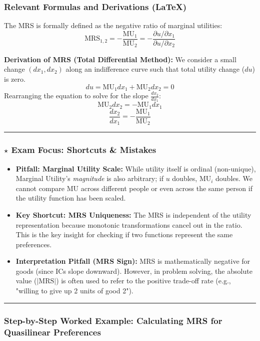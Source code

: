 \documentclass{article}
\begin{document}
\subsubsection*{Relevant Formulas and Derivations (LaTeX)}

The MRS is formally defined as the negative ratio of marginal utilities: \[\text{MRS}_{1,2} = -\frac{\text{MU}_1}{\text{MU}_2} = -\frac{\partial u/\partial x_1}{\partial u/\partial x_2}\]

\textbf{Derivation of MRS (Total Differential Method):} We consider a small change $(dx_1, dx_2)$ along an indifference curve such that total utility change ($du$) is zero. \[du = \text{MU}_1 dx_1 + \text{MU}_2 dx_2 = 0\] Rearranging the equation to solve for the slope $\frac{dx_2}{dx_1}$: \[\text{MU}_2 dx_2 = -\text{MU}_1 dx_1\] \[\frac{dx_2}{dx_1} = -\frac{\text{MU}_1}{\text{MU}_2}\]

\noindent\rule{\linewidth}{0.4pt}

\subsubsection*{$\star$ Exam Focus: Shortcuts \& Mistakes}
\begin{itemize}
    \item \textbf{Pitfall: Marginal Utility Scale:} While utility itself is ordinal (non-unique), Marginal Utility's \textit{magnitude} is also arbitrary; if $u$ doubles, $\text{MU}_i$ doubles. We cannot compare MU across different people or even across the same person if the utility function has been scaled.

    \item \textbf{Key Shortcut: MRS Uniqueness:} The MRS is independent of the utility representation because monotonic transformations cancel out in the ratio. This is the key insight for checking if two functions represent the same preferences.

    \item \textbf{Interpretation Pitfall (MRS Sign):} MRS is mathematically negative for goods (since ICs slope downward). However, in problem solving, the absolute value ($|\text{MRS}|$) is often used to refer to the positive trade-off rate (e.g., "willing to give up 2 units of good 2").
\end{itemize}

\noindent\rule{\linewidth}{0.4pt}

\subsubsection*{Step-by-Step Worked Example: Calculating MRS for Quasilinear Preferences}
\end{document}
